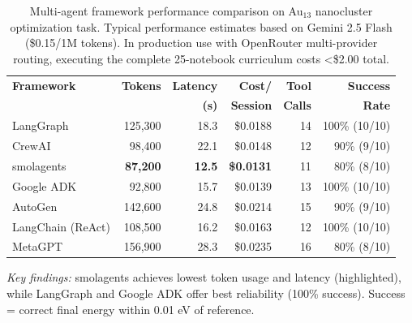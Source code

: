 \begin{table}[htbp]
\centering
\caption{Multi-agent framework performance comparison on Au$_{13}$ nanocluster optimization task. Typical performance estimates based on Gemini 2.5 Flash (\$0.15/1M tokens). In production use with OpenRouter multi-provider routing, executing the complete 25-notebook curriculum costs <\$2.00 total.}
\label{tab:frameworks}
\small
\begin{tabular}{@{}lrrrrr@{}}
\toprule
\textbf{Framework} & \textbf{Tokens} & \textbf{Latency} & \textbf{Cost/} & \textbf{Tool} & \textbf{Success} \\
 & & \textbf{(s)} & \textbf{Session} & \textbf{Calls} & \textbf{Rate} \\
\midrule
LangGraph & 125,300 & 18.3 & \$0.0188 & 14 & 100\% (10/10) \\
CrewAI & 98,400 & 22.1 & \$0.0148 & 12 & 90\% (9/10) \\
\rowcolor{green!10}
smolagents & \textbf{87,200} & \textbf{12.5} & \textbf{\$0.0131} & 11 & 80\% (8/10) \\
Google ADK & 92,800 & 15.7 & \$0.0139 & 13 & 100\% (10/10) \\
AutoGen & 142,600 & 24.8 & \$0.0214 & 15 & 90\% (9/10) \\
LangChain (ReAct) & 108,500 & 16.2 & \$0.0163 & 12 & 100\% (10/10) \\
MetaGPT & 156,900 & 28.3 & \$0.0235 & 16 & 80\% (8/10) \\
\bottomrule
\end{tabular}

\vspace{0.3cm}
\footnotesize
\textit{Key findings:} smolagents achieves lowest token usage and latency (highlighted), while LangGraph and Google ADK offer best reliability (100\% success). Success = correct final energy within 0.01 eV of reference.
\end{table}
